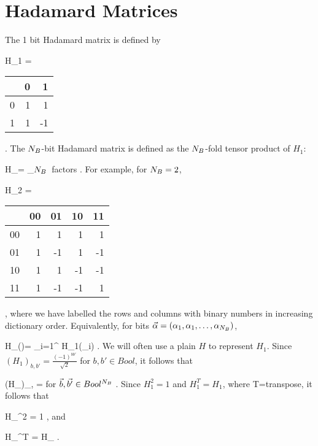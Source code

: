 \chapter{Hadamard Matrices}

The 1 bit Hadamard matrix is defined by

\beq
H_1 =
\begin{tabular}{r|rr}
         & {\tiny 0} & {\tiny 1} \\
\hline
{\tiny 0}& 1&  1\\
{\tiny 1}& 1& -1\\
\end{tabular}
\;.
\eeq
The ${N_B}$-bit Hadamard matrix is defined
as the ${N_B}$-fold tensor product of $H_1$:

\beq
H_\nb = _{\mbox{$\nb$ factors}}
\;.
\eeq
For example, for ${N_B}=2$,

\beq
H_2 =
\begin{tabular}{r|rrrr}
         & {\tiny 00} & {\tiny 01} & {\tiny 10} & {\tiny 11}\\
\hline
{\tiny 00}&  1&  1&  1&  1\\
{\tiny 01}&  1& -1&  1& -1\\
{\tiny 10}&  1&  1& -1& -1\\
{\tiny 11}&  1& -1& -1&  1\\
\end{tabular}
\;,
\eeq
where we have labelled
the rows and columns with binary numbers
 in increasing dictionary order.
Equivalently, for bits
$\vec{\alpha}=(\alpha_1,
\alpha_1, \ldots, \alpha_{{N_B}})$,

\beq
H_\nb(\vec{\alpha})=
\prod_{i=1}^{\nb}
H_1(\alpha_i)
\;.
\eeq
We will often use a plain $H$
to represent $H_1$.
Since
$(H_1)_{b,b'} = \frac{(-1)^{bb'}}{\sqrt{2}}$
 for $b, b'\in Bool$,
it follows that

 \beq
 (H_\nb)_{,} =
 \;
 \eeq
 for $\vec{b}, \vec{b'}\in Bool^{N_B}$ .
Since $H_1^2=1$ and $H_1^T=H_1$, where
T=transpose, it follows that

\beq
H_\nb^2 = 1
\;,
\eeq
and

\beq
H_\nb^T = H_\nb
\;.
\eeq
